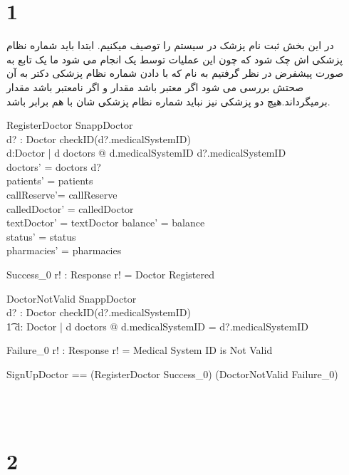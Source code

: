 \documentclass{article}
\begin{document}
\section*{1}
در این بخش ثبت نام پزشک در سیستم را توصیف میکنیم. ابتدا باید شماره نظام پزشکی اش چک شود که چون این عملیات توسط یک  انجام می شود ما یک تابع به صورت پیشفرض در نظر گرفتیم به نام  که با دادن شماره نظام پزشکی دکتر به آن صحتش بررسی می شود اگر معتبر باشد مقدار  و اگر نامعتبر باشد مقدار  برمیگرداند.هیچ دو پزشکی نیز نباید شماره نظام پزشکی شان با هم برابر باشد.
\begin{schema}{RegisterDoctor}
\Delta SnappDoctor\\
d? : Doctor
\where
checkID(d?.medicalSystemID)\\
\forall d:Doctor | d \in doctors @ d.medicalSystemID \neq d?.medicalSystemID\\
doctors' = doctors \cup d?\\
patients' = patients\\ 
callReserve'= callReserve\\
calledDoctor' = calledDoctor\\
textDoctor' = textDoctor
balance' = balance\\
status' = status\\
pharmacies' = pharmacies  
\end{schema}

\begin{schema}{Success_0}
r! : Response
\where
r! = Doctor Registered
\end{schema}



\begin{schema}{DoctorNotValid}
\Xi SnappDoctor\\
d? : Doctor
\where
\neg checkID(d?.medicalSystemID) \lor\\ 
\t1 \exists d: Doctor | d \in doctors @ d.medicalSystemID = d?.medicalSystemID
\end{schema}

\begin{schema}{Failure_0}
r! : Response
\where
r! = Medical System ID is Not Valid
\end{schema}

\begin{zed}
SignUpDoctor == (RegisterDoctor \land Success_0) \lor (DoctorNotValid \land Failure_0)
\end{zed}
\\
\\
\section*{2}
\end{document}
